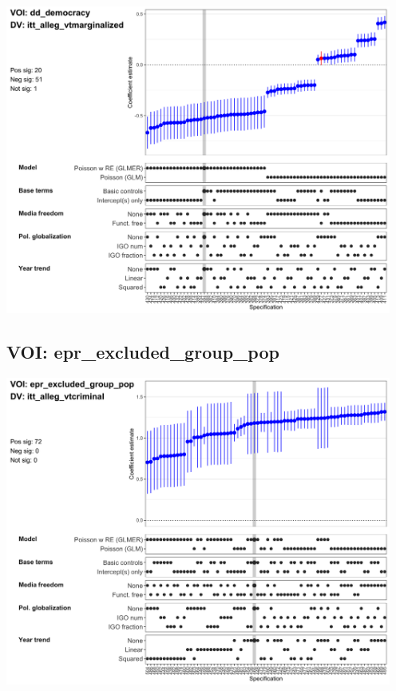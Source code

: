 \documentclass[]{article}
\begin{document}
\includegraphics[height=4in]{../output/figures-robustness/specplot-dd_democracy-itt_alleg_vtmarginalized.png}

\hypertarget{voi-epr_excluded_group_pop}{%
\subsection{VOI:
epr\_excluded\_group\_pop}\label{voi-epr_excluded_group_pop}}

\includegraphics[height=4in]{../output/figures-robustness/specplot-epr_excluded_group_pop-itt_alleg_vtcriminal.png}
\end{document}
